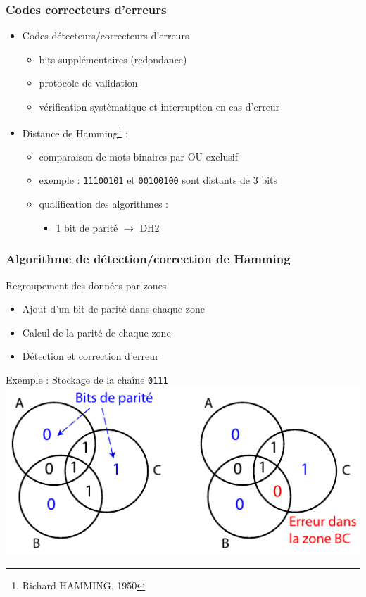 \begin{frame}
\frametitle{Codes correcteurs d'erreurs}
\begin{itemize}
\item <1> Codes détecteurs/correcteurs d'erreurs
\begin{itemize}
\item bits supplémentaires (redondance)
\item protocole de validation
\item vérification systèmatique et interruption en cas d'erreur
\end{itemize}
\item <2> Distance de Hamming\footnote{Richard HAMMING, 1950} :
\begin{itemize}
\item comparaison de mots binaires par OU exclusif
\item exemple : \texttt{11100101} et \texttt{00100100} sont distants de 3 bits
\item qualification des algorithmes : 
\begin{itemize}
\item 1 bit de parité $\rightarrow$ DH2
\end{itemize}
\end{itemize}
\end{itemize}
\end{frame}

\begin{frame}
\frametitle{Algorithme de détection/correction de Hamming}
Regroupement des données par zones
\begin{itemize}
\item Ajout d'un bit de parité dans chaque zone
\item Calcul de la parité de chaque zone
\item Détection et correction d'erreur
\end{itemize}
\begin{exampleblock}{Exemple : Stockage de la chaîne \texttt{0111}}
\includegraphics{../illustration/hamming.pdf}
\end{exampleblock}
\end{frame}

